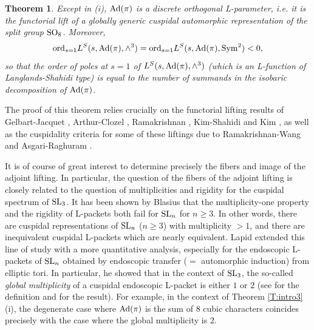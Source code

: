 \documentclass[11pt]{amsart}
\theoremstyle{plain}
\newtheorem{thm}[equation]{Theorem}
\numberwithin{equation}{section}
\def\SL{{\rm SL}}
\def\SO{{\rm SO}}
\begin{document}
\begin{thm}
Except in (i), ${\rm Ad}(\pi)$ is a discrete orthogonal L-parameter, i.e. it is the functorial lift of  a globally generic cuspidal automorphic representation of the split group $\SO_8$.  Moreover, 
\[ {\rm ord}_{s=1} L^S( s, {\rm Ad}(\pi), \wedge^3) = {\rm ord}_{s=1} L^S(s, {\rm Ad}(\pi), {\rm Sym}^2) < 0,  \]
so that the order of poles at $s=1$ of $L^S(s, {\rm Ad}(\pi), \wedge^3)$  (which is an L-function of Langlands-Shahidi type) is equal to the number of summands in the isobaric decomposition of ${\rm Ad}(\pi)$.


\end{thm}
\vskip 5pt

\noindent The proof of this theorem relies crucially on the functorial lifting results  of Gelbart-Jacquet \cite{GJ}, Arthur-Clozel \cite{AC}, 
Ramakrishnan \cite{Ra1}, Kim-Shahidi \cite{KS1} and  Kim \cite{Ki}, as well as the cuspidality criteria for some of these liftings due to Ramakrishnan-Wang \cite{RW} and Asgari-Raghuram \cite{AR}.
 
\vskip 5pt

It is of course of great interest to determine precisely the fibers and image of the adjoint lifting. In particular, the question of the fibers of the adjoint lifting is closely related to the question of multiplicities and rigidity for the cuspidal spectrum of $\SL_3$. 
It has been shown by Blasius \cite{B}  that the multiplicity-one property and the rigidity of L-packets both fail for $\SL_n$ for $n \geq 3$. 
In other words, there are cuspidal representations of $\SL_n$ ($n \geq 3$) with multiplicity $>1$, and there are inequivalent cuspidal L-packets which are nearly equivalent.  
Lapid  \cite{L1} extended this line of study with a more quantitative analysis, especially for the endoscopic L-packets of $\SL_n$ obtained by endoscopic transfer ($=$ automorphic induction) from elliptic tori. In particular, he showed that in the context of $\SL_3$, the so-called {\it global multiplicity} of a cuspidal endoscopic L-packet is either $1$ or $2$ (see \cite[\S2, Pg 162]{L1} for the definition and \cite[Theorem 4]{L1} for the result). 
 For example, in the context of Theorem \ref{T:intro3}(i), the degenerate case where ${\rm Ad}(\pi)$ is the sum of 8 cubic characters coincides precisely with the case where the global multiplicity is $2$. 
\vskip 5pt
\end{document}
